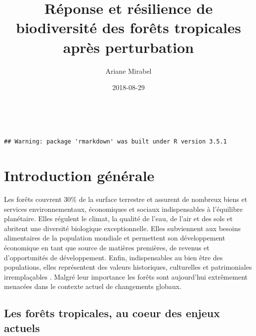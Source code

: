 \documentclass[
  11pt,
  french,
  A4paper,
  extrafontsizes,onecolumn,openright
  ]{memoir}
\title{Réponse et résilience de biodiversité des forêts tropicales après
perturbation}
\author{Ariane Mirabel}
\date{2018-08-29}
\begin{document}
\frontmatter



\makeflyleaf
\newpage
~
\newpage









\LargeMargins
{
\hypersetup{linkcolor=}
\setcounter{tocdepth}{3}
\tableofcontents
}



\LargeMargins






\begin{verbatim}
## Warning: package 'rmarkdown' was built under R version 3.5.1
\end{verbatim}

\mainmatter

\chapter{Introduction générale}\label{introduction-generale}

Les forêts couvrent 30\% de la surface terrestre et assurent de nombreux
biens et services environnementaux, économiques et sociaux
indispensables à l'équilibre planétaire. Elles régulent le climat, la
qualité de l'eau, de l'air et des sols et abritent une diversité
biologique exceptionnelle. Elles subviennent aux besoins alimentaires de
la population mondiale et permettent son développement économique en
tant que source de matières premières, de revenus et d'opportunités de
développement. Enfin, indispensables au bien être des populations, elles
représentent des valeurs historiques, culturelles et patrimoniales
irremplaçables \autocites{FRA2015}{Tilman2014}. Malgré leur importance
les forêts sont aujourd'hui extrêmement menacées dans le contexte actuel
de changements globaux.

\section{Les forêts tropicales, au coeur des enjeux
actuels}\label{les-forets-tropicales-au-coeur-des-enjeux-actuels}
\end{document}
